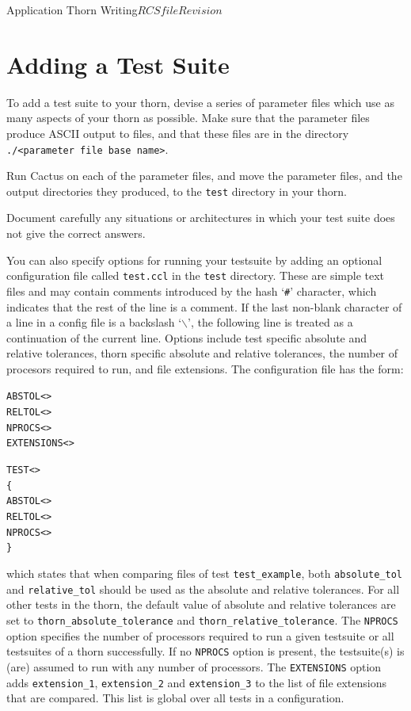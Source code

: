 \begin{cactuspart}{Application Thorn Writing}{$RCSfile$}{$Revision$}
\begin{itemize}
\end{itemize}


\section{Adding a Test Suite}
\label{sec:adding_test_suite}

To add a test suite to your thorn, devise a series of parameter
files which use as many aspects of your thorn as possible.
Make sure that the parameter files produce ASCII output to files,
and that these files are in the directory
\texttt{./<parameter file base name>}.

Run Cactus on each of the parameter files, and move the parameter files,
and the output directories they produced, to the \texttt{test} directory
in your thorn.

Document carefully any situations or architectures in which your test
suite does not give the correct answers.

You can also specify options for running your testsuite by adding an
optional configuration file called \texttt{test.ccl} in the \texttt{test}
directory. These are simple text files and may contain comments
introduced by the hash `\texttt{\#}' character, which indicates that the
rest of the line is a comment. If the last non-blank character of a
line in a config file is a backslash `\texttt{$\backslash$}', the
following line is treated as a continuation of the current line.
Options include test specific absolute and relative tolerances, thorn
specific absolute and relative tolerances, the number of procesors required
to run, and file extensions. The configuration file has the form:

\begin{alltt}
ABSTOL  <>
RELTOL  <>
NPROCS  <>
EXTENSIONS  <  >

TEST <>
\{
  ABSTOL <>
  RELTOL <>
  NPROCS <>
\}
\end{alltt}

which states that when comparing files of test \verb|test_example|, both
\verb|absolute_tol| and \verb|relative_tol| should be used as
the absolute and relative tolerances. For all other tests in the
thorn, the default value of absolute and relative tolerances are set
to \verb|thorn_absolute_tolerance| and \verb|thorn_relative_tolerance|.
The \texttt{NPROCS} option specifies the number of processors required to
run a given testsuite  or all testsuites of a thorn
successfully. If no \texttt{NPROCS} option is present, the testsuite(s)
is (are) assumed to run with any number of processors.
The \texttt{EXTENSIONS} option adds
\verb|extension_1|, \verb|extension_2| and \verb|extension_3| to the
list of file extensions that are compared. This list is global over
all tests in a configuration.


\end{cactuspart}
